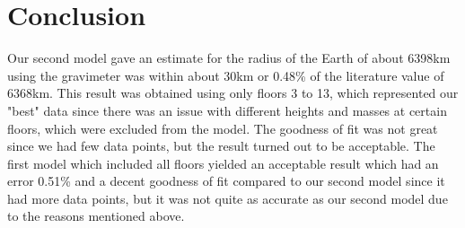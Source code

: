 \documentclass[a4paper, 11pt]{article}
\begin{document}
\section*{Conclusion}
Our second model gave an estimate for the radius of the Earth of about 6398km using the gravimeter was within about 30km or 0.48\% of the literature value of 6368km. This result was obtained using only floors 3 to 13, which represented our "best" data since there was an issue with different heights and masses at certain floors, which were excluded from the model. The goodness of fit was not great since we had few data points, but the result turned out to be acceptable. The first model which included all floors yielded an acceptable result which had an error 0.51\% and a decent goodness of fit compared to our second model since it had more data points, but it was not quite as accurate as our second model due to the reasons mentioned above.
\end{document}
